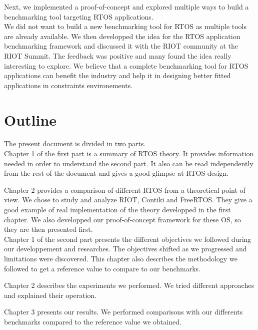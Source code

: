 Next, we implemented a proof-of-concept and explored multiple ways to build a benchmarking tool targeting RTOS applications.\\

We did not want to build a new benchmarking tool for RTOS as multiple tools are already available.
We then developped the idea for the RTOS application benchmarking framework and discussed it with the RIOT community at the RIOT Summit.
The feedback was positive and many found the idea really interesting to explore.
We believe that a complete benchmarking tool for RTOS applications can benefit the industry 
    and help it in designing better fitted applications in constraints environements.
%
%
\section*{Outline}
The present document is divided in two parts.\\

Chapter 1 of the first part is a summary of RTOS theory.
It provides information needed in order to understand the second part.
It also can be read independently from the rest of the document and gives a good glimpse at RTOS design.

Chapter 2 provides a comparison of different RTOS from a theoretical point of view.
We chose to study and analyze RIOT, Contiki and FreeRTOS.
They give a good example of real implementation of the theory developped in the first chapter.
We also developped our proof-of-concept framework for these OS, so they are then presented first.\\

Chapter 1 of the second part presents the different objectives we followed during our developpement and researches.
The objectives shifted as we progressed and limitations were discovered.
This chapter also describes the methodology we followed to get a reference value to compare to our benchmarks.

Chapter 2 describes the experiments we performed.
We tried different approaches and explained their operation.

Chapter 3 presents our results.
We performed comparisons with our differents benchmarks compared to the reference value we obtained.

